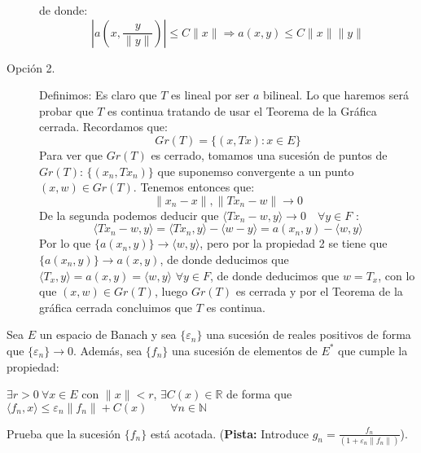 \begin{ejercicio}
\begin{description}
            de donde:
            \begin{equation*}
                \left|a\left(x,\frac{y}{\|y\|}\right)\right| \leq C\|x\| \Longrightarrow a(x,y) \leq C\|x\|\|y\|
            \end{equation*}
        \item [Opción 2.] Definimos:
            Es claro que $T$ es lineal por ser $a$ bilineal. Lo que haremos será probar que $T$ es continua tratando de usar el Teorema de la Gráfica cerrada. Recordamos que:
            \begin{equation*}
                Gr(T) = \{(x,Tx) : x\in E\}
            \end{equation*}
            Para ver que $Gr(T)$ es cerrado, tomamos una sucesión de puntos de $Gr(T)$: $\{(x_n,Tx_n)\}$ que suponemso convergente a un punto $(x,w)\in Gr(T)$. Tenemos entonces que:
            \begin{equation*}
                \|x_n-x\|, \|Tx_n - w\| \to 0
            \end{equation*}
            De la segunda podemos deducir que $\langle Tx_n - w,y \rangle\to 0 \quad \forall y\in F$ :
            \begin{equation*}
                \langle Tx_n - w,y \rangle  = \langle Tx_n,y \rangle - \langle w-y \rangle  = a(x_n,y) - \langle w,y \rangle 
            \end{equation*}
            Por lo que $\{a(x_n,y)\}\to \langle w,y \rangle $, pero por la propiedad 2 se tiene que $\{a(x_n,y)\}\to a(x,y)$, de donde deducimos que $\langle T_x,y \rangle= a(x,y) = \langle w,y \rangle $ $\forall y\in F$, de donde deducimos que $w=T_x$, con lo que $(x,w)\in Gr(T)$, luego $Gr(T)$ es cerrada y por el Teorema de la gráfica cerrada concluimos que $T$ es continua.
    \end{description}
\end{ejercicio}

\begin{ejercicio}\label{ej:5_rel2}
    Sea $E$ un espacio de Banach y sea $\{\varepsilon_n\}$ una sucesión de reales positivos de forma que $\{\varepsilon_n\}\to 0$. Además, sea $\{f_n\}$ una sucesión de elementos de $E^\ast$ que cumple la propiedad:
    \begin{center}
        $\exists r>0~\forall x\in E$ con $\|x\|<r$, $\exists C(x)\in \mathbb{R}$ de forma que $\langle f_n,x \rangle \leq \varepsilon_n\|f_n\| + C(x)\qquad \forall n\in \mathbb{N}$
    \end{center}
    Prueba que la sucesión $\{f_n\}$ está acotada.\newline
    (\textbf{Pista:} Introduce $g_n = \frac{f_n}{(1+\varepsilon_n\|f_n\|)}$).
\end{ejercicio}


